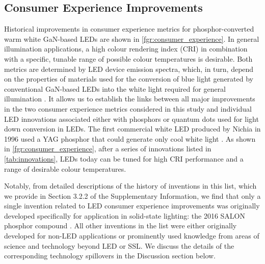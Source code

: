 \documentclass[parskip=full]{article}
\begin{document}
\subsection{Consumer Experience Improvements}

Historical improvements in consumer experience metrics for phosphor-converted warm white GaN-based LEDs are shown in \cref{fgr:consumer_experience}. In general illumination applications, a high colour rendering index (CRI) in combination with a specific, tunable range of possible colour temperatures is desirable. Both metrics are determined by LED device emission spectra, which, in turn, depend on the properties of materials used for the conversion of blue light generated by conventional GaN-based LEDs into the white light required for general illumination . It allows us to establish the links between all major improvements in the two consumer experience metrics considered in this study and individual LED innovations  associated either with phosphors or quantum dots used for light down conversion in LEDs. The first commercial white LED produced by Nichia in 1996 used a YAG phosphor that could generate only cool white light \cite{bando1998development}. As shown in \cref{fgr:consumer_experience}, after a series of innovations listed in \cref{tab:innovations}, LEDs today can be tuned for high CRI performance and a range of desirable colour temperatures.  

Notably, from detailed descriptions of the history of inventions in this list, which we provide in Section 3.2.2 of the Supplementary Information, we find that only a single invention related to LED consumer experience improvements was originally developed specifically for application in solid-state lighting: the 2016 SALON phosphor compound \cite{seibald2019phosphor,Hoerder2019}. All other inventions in the list were either originally developed for non-LED applications or prominently used knowledge from areas of science and technology beyond LED or SSL. We discuss the details of the corresponding technology spillovers in the Discussion section below.
\end{document}
